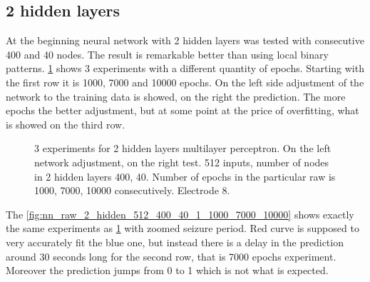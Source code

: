 \subsection{2 hidden layers}
At the beginning neural network with 2 hidden layers was tested with consecutive 400 and 40 nodes. The result is remarkable better than using local binary patterns. \figurename{} \ref{fig:nn_raw_2_hidden_512_400_40_1_1000_7000_10000_not_zoomed} shows 3 experiments with a different quantity of epochs. Starting with the first row it is 1000, 7000 and 10000 epochs. On the left side adjustment of the network to the training data is showed, on the right the prediction. The more epochs the better adjustment, but at some point at the price of overfitting, what is showed on the third row.

\begin{figure}[H]
	\begin{center}
	\end{center}
	\caption{3 experiments for 2 hidden layers multilayer perceptron. On the left network adjustment, on the right test. 512 inputs, number of nodes in 2 hidden layers 400, 40. Number of epochs in the particular raw is 1000, 7000, 10000 consecutively. Electrode 8.}

	\label{fig:nn_raw_2_hidden_512_400_40_1_1000_7000_10000_not_zoomed}
\end{figure}
The \figurename{} \ref{fig:nn_raw_2_hidden_512_400_40_1_1000_7000_10000} shows exactly the same experiments as \figurename{} \ref{fig:nn_raw_2_hidden_512_400_40_1_1000_7000_10000_not_zoomed} with zoomed seizure period. Red curve is supposed to very accurately fit the blue one, but instead there is a delay in the prediction around 30 seconds long for the second row, that is 7000 epochs experiment. Moreover the prediction jumps from 0 to 1 which is not what is expected. 

